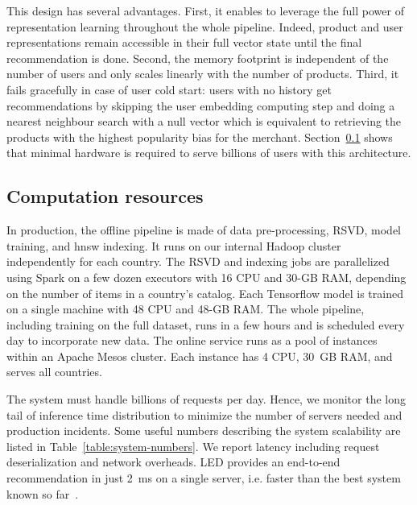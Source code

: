 \documentclass[sigconf]{acmart}
\begin{document}
This design has several advantages. First, it enables to leverage the full power of representation learning throughout the whole pipeline. Indeed, product and user representations remain accessible in their full vector state until the final recommendation is done. Second, the memory footprint is independent of the number of users and only scales linearly with the number of products. Third, it fails gracefully in case of user cold start: users with no history get recommendations by skipping the user embedding computing step and doing a nearest neighbour search with a null vector which is equivalent to retrieving the products with the highest popularity bias for the merchant. Section~\ref{subsec:compute-resources} shows that minimal hardware is required to serve billions of users with this architecture.

\subsection{Computation resources}
\label{subsec:compute-resources}

In production, the offline pipeline is made of data pre-processing, RSVD, model training, and hnsw indexing. It runs on our internal Hadoop cluster independently for each country.
The RSVD and indexing jobs are parallelized using Spark on a few dozen executors with 16 CPU and 30-GB RAM, depending on the number of items in a country's catalog. Each Tensorflow model is trained on a single machine with 48 CPU and 48-GB RAM.
The whole pipeline, including training on the full dataset, runs in a few hours and is scheduled every day to incorporate new data. The online service runs as a pool of instances within an Apache Mesos cluster. Each instance has 4 CPU, 30~GB RAM, and serves all countries. 



The system must handle billions of requests per day. Hence, we monitor the long tail of inference time distribution to minimize the number of servers needed and production incidents. Some useful numbers describing the system scalability are listed in Table~\ref{table:system-numbers}. We report latency including request deserialization and network overheads. LED provides an end-to-end recommendation in just 2~ms on a single server, i.e.  faster than the best system known so far~\cite{pixie-pinterest-www-2018}.
\end{document}

